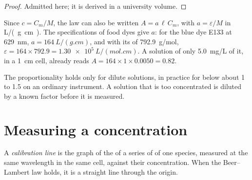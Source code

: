 \begin{proof}
Admitted here; it is derived in a university volume.
\end{proof}


\begin{remark}\label{rem:g11:absorbance:mass}
Since $c = C_m / M$, the law can also be written $A = a\, \ell\, C_m$,
with $a = \varepsilon / M$ in \si{L/(g.cm)}. The specifications of food
dyes give $a$: for the blue dye E133 at \qty{629}{nm}, $a =
\qty{164}{L/(g.cm)}$, and with its  of \qty{792.9}{g/mol},
$\varepsilon = 164 \times 792.9 = \qty{1.30e5}{L/(mol.cm)}$. A solution
of only \qty{5.0}{mg/L} of it, in a \qty{1}{cm} cell, already reads
$A = 164 \times 1 \times 0.0050 = 0.82$.
\end{remark}

\begin{remark}\label{rem:g11:absorbance:dilute}
The proportionality holds only for dilute solutions, in practice for
 below about 1 to 1.5 on an ordinary instrument. A solution
that is too concentrated is diluted by a known factor before it is
measured.
\end{remark}

\section{Measuring a concentration}

\begin{definition}\label{def:g11:absorbance:calibration-line}
A \emph{calibration line} is the graph of the
 of a series of  of one species, measured at
the same wavelength in the same cell, against their concentration. When
the Beer--Lambert law holds, it is a straight line through the origin.
\end{definition}

